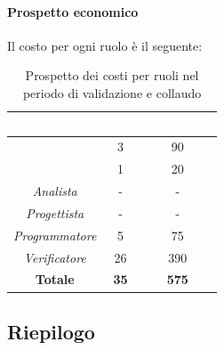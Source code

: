 \paragraph*{Prospetto economico}
Il costo per ogni ruolo è il seguente:
\begin{table}[H]
	\begin{center}
		\begin{tabular}{ |c c c| }
			\rowcolor{darkblue} 
			\textcolor{white}{\textbf{Ruolo}} & \textcolor{white}{\textbf{Ore}} & \textcolor{white}{\textbf{Costo in €}}\\ \hline
			{\Responsabile} 			& 3 	& 90 \\ \hline
			{\Amministratore}		 	& 1 	& 20 \\ \hline
			\textit{Analista} 			& - 	& - \\ \hline
			\textit{Progettista} 		& -	& - \\ \hline
			\textit{Programmatore}  	& 5 	& 75 \\ \hline
			\textit{Verificatore} 		& 26 	& 390 \\ \hline
			\textbf{Totale} & \textbf{35} & \textbf{575} \\ \hline
		\end{tabular}
		\caption{Prospetto dei costi per ruoli nel periodo di validazione e collaudo}
	\end{center}
\end{table}
\newpage

\subsection{Riepilogo}
